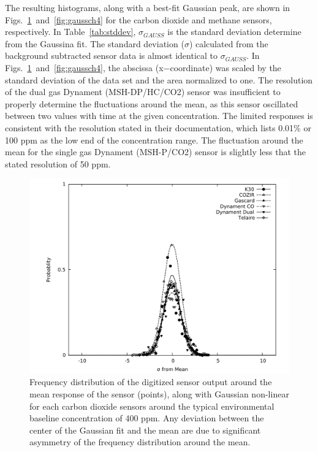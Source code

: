 \documentclass[preprint,sort&compress]{elsarticle}
\begin{document}
			The resulting histograms, along with a best-fit Gaussian peak, are shown in Figs.~\ref{fig:gaussco2}~and~\ref{fig:gaussch4} for the carbon dioxide and methane sensors, respectively.  In Table~\ref{tab:stddev}, $\sigma_{GAUSS}$ is the standard deviation determine from the Gaussina fit.  The standard deviation ($\sigma$) calculated from the background subtracted sensor data is almost identical to $\sigma_{GAUSS}$.  In Figs.~\ref{fig:gaussco2}~and~\ref{fig:gaussch4}, the abscissa (x$-$coordinate) was scaled by the standard deviation of the data set and the area normalized to one.  The resolution of the dual gas Dynament (MSH-DP/HC/CO2) sensor was insufficient to properly determine the fluctuations around the mean, as this sensor oscillated between two values with time at the given concentration.  The limited responses is consistent with the resolution stated in their documentation, which lists 0.01\% or 100 ppm as the low end of the concentration range.  The fluctuation around the mean for the single gas Dynament (MSH-P/CO2) sensor is slightly less that the stated resolution of 50 ppm.
	
			\begin{figure}[!t]
				\centering
				\includegraphics[width=\columnwidth]{honey7.pdf}
				\caption{Frequency distribution of the digitized sensor output around the mean response of the sensor (points), along with Gaussian non-linear for each carbon dioxide sensors around the typical environmental baseline concentration of 400 ppm.  Any deviation between the center of the Gaussian fit and the mean are due to significant asymmetry of the frequency distribution around the mean.}
				\label{fig:gaussco2}
			\end{figure}
			
\end{document}
